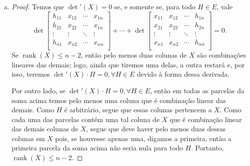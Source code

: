 \documentclass[12pt,a4paper]{article}
\DeclareMathOperator{\tr}{tr}
\DeclareMathOperator{\rank}{rank}
\begin{document}
\begin{enumerate}[a)]
\begin{proof}
\begin{align*}
                &= h_{11} + \cdots + h_{nn} \\
                &= \tr(H).
            \end{align*}
        \end{proof}
        \item 
        \begin{proof}
            Temos que $\det'(X) = 0$ se, e somente se, para todo $H\in E$, vale
            \begin{equation*}
                \det\begin{bmatrix}
                        h_{11} & x_{12} & \cdots & x_{1n} \\
                        h_{21} & x_{22} & \cdots & x_{1n} \\
                        \vdots & \vdots & \ddots & \vdots \\
                        h_{n1} & x_{n2} & \cdots & x_{nn} \\
                    \end{bmatrix}
                    + \cdots + 
                \det\begin{bmatrix}
                        x_{11} & x_{12} & \cdots & h_{1n} \\
                        x_{21} & x_{22} & \cdots & h_{2n} \\
                        \vdots & \vdots & \ddots & \vdots \\
                        x_{n1} & x_{n2} & \cdots & h_{nn} \\
                    \end{bmatrix} = 0.
            \end{equation*}
            Se $\rank(X)\leq n-2$, então pelo menos duas colunas de $X$ são combinações lineares
            das demais; logo, ainda que tiremos uma delas, a outra restará e, por isso, teremos
            $\det'(X)\cdot H = 0, \forall H\in E$ devido à forma dessa derivada.
            
            Por outro lado, se $\det'(X)\cdot H = 0, \forall H\in E$, então em todas as parcelas da soma
            acima temos pelo menos uma coluna que é combinação linear das demais. Como $H$ é arbitrário,
            segue que essas colunas pertencem a $X$. Como cada uma das parcelas contém uma tal coluna
            de $X$ que é combinação linear das demais colunas de $X$, segue que deve haver pelo menos
            duas dessas colunas em $X$ pois, se houvesse apenas uma, digamos a primeira, então a primeira
            parcela da soma acima não seria nula para todo $H$. Portanto, $\rank(X)\leq n-2$.
        \end{proof}
    \end{enumerate}
%
\end{document}
